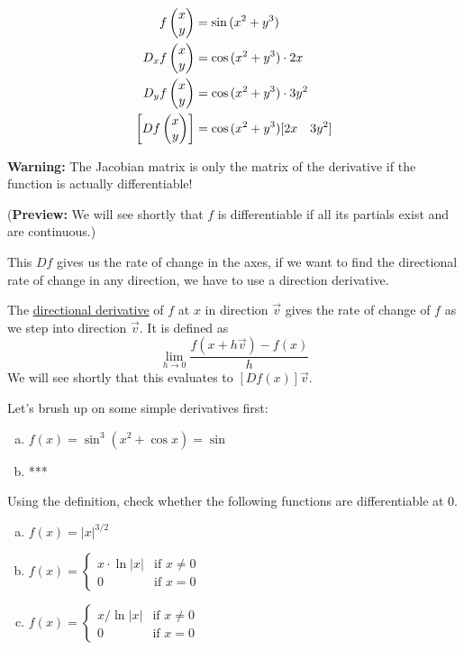 \example
\begin{align*}
  f\begin{pmatrix} x \\ y \end{pmatrix} &= \sin{(x^2+y^3)} \\
  D_x f\begin{pmatrix} x \\ y \end{pmatrix} &= \cos{(x^2 + y^3)}\cdot 2x \\
  D_y f\begin{pmatrix} x \\ y \end{pmatrix} &= \cos{(x^2 + y^3)}\cdot 3y^2 \\
  \left[Df\begin{pmatrix} x \\ y \end{pmatrix}\right] &= \cos{(x^2 + y^3) [2x \quad 3y^2]}
\end{align*}

\textbf{Warning:} The Jacobian matrix is only the matrix of the derivative if the function is actually differentiable!

(\textbf{Preview:} We will see shortly that $f$ is differentiable if all its partials exist and are continuous.)

This $Df$ gives us the rate of change in the axes, if we want to find the directional rate of change in any direction, we have to use a direction derivative.

\begin{defn}
The \ul{directional derivative} of $f$ at $x$ in direction $\vec{v}$ gives the rate of change of $f$ as we step into direction $\vec{v}$. It is defined as
\[\lim_{h\to 0}\frac{f(x+h\vec{v})-f(x)}{h}\]
We will see shortly that this evaluates to $[Df(x)]\vec{v}$.
\end{defn}

Let's brush up on some simple derivatives first:
\begin{enumerate}[a.]
  \item $f(x) = \sin^3{(x^2 + \cos{x})} = \sin$
  \item ***
\end{enumerate}

 Using the definition, check whether the following functions are differentiable at 0.
\begin{enumerate}[a.]
  \item $f(x) = |x|^{3/2}$
  \item $\displaystyle f(x) = \begin{cases}x \cdot \ln{|x|} & \text{if } x \neq 0 \\ 0 & \text{if } x = 0 \end{cases}$ \\
  \item $\displaystyle f(x) = \begin{cases}x/ \ln{|x|} & \text{if } x \neq 0 \\ 0 & \text{if } x = 0\end{cases}$ \\
\end{enumerate}

